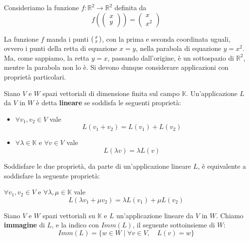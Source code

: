 \begin{example}
	Consideriamo la funzione $\textit{f} : \mathbb{R}^2 \to \mathbb{R}^2$
	definita da
	\begin{equation*}
		\textit{f}\left(
		\begin{pmatrix}
				x \\ y
			\end{pmatrix}
		\right) =
		\begin{pmatrix}
			x \\ x^2
		\end{pmatrix}
	\end{equation*}

	La funzione $f$ manda i punti
	$\begin{psmallmatrix}
			x \\ x
		\end{psmallmatrix}$,
	con la prima e seconda coordinata uguali, ovvero i punti della retta
	di equazione $x = y$, nella parabola di equazione $y = x^2$.
	Ma, come sappiamo, la retta $y = x$, passando dall'origine, \`e un
	sottospazio di $\mathbb{R}^2$, mentre la parabola non lo \`e.
	Si devono dunque considerare applicazioni con propriet\`a particolari.
\end{example}

\begin{defn}
	Siano $V$ e $W$ spazi vettoriali di dimensione finita sul campo
	$\mathbb{K}$. Un'applicazione $L$ da $V$ in $W$ \`e detta
	\textbf{lineare} se soddisfa le seguenti propriet\`a:
	\begin{itemize}
		\item $\forall v_1, v_2 \in V$ vale \[ L(v_1 + v_2) = L(v_1) + L(v_2) \]
		\item
		      $\forall \lambda \in \mathbb{K}$ e $\forall v \in V$
		      vale \[ L(\lambda v) = \lambda L(v) \]
	\end{itemize}
\end{defn}

\begin{observation}
	Soddisfare le due propriet\`a, da parte di un'applicazione lineare $L$,
	\`e equivalente a soddisfare la seguente propriet\`a:

	$\forall v_1, v_2 \in V$ e $\forall \lambda, \mu \in \mathbb{K}$ vale
	\begin{equation*}
		L(\lambda v_1 + \mu v_2) = \lambda L(v_1) + \mu L(v_2)
	\end{equation*}
\end{observation}

\begin{defn}
	Siano $V$ e $W$ spazi vettoriali su $\mathbb{K}$ e $L$ un'applicazione
	lineare da $V$ in $W$. Chiamo \textbf{immagine} di $L$, e la indico con
	$Imm(L)$, il seguente sottoinsieme di $W$:
	\begin{equation*}
		Imm(L) = \{w \in W \mid \forall v \in V, \quad L(v) = w\}
	\end{equation*}
\end{defn}

